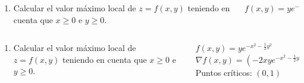 \documentclass[aspectratio=149,10pt,t]{beamer}
\begin{document}
\begin{frame}
\begin{columns}
\begin{column}[T]{0.7\textwidth}
\begin{enumerate}
\item Calcular el valor máximo local de $z=f(x,y)$ teniendo en cuenta que $x\geq 0$ e $y\geq 0$.
\end{enumerate}
\end{column}
\begin{column}[T]{0.3\textwidth}
\begin{datos}
$f(x,y)=ye^{-x^2-\frac{1}{2}y^2}$
\end{datos}
\end{column}
\end{columns}
\end{frame}


\begin{frame}
\begin{columns}
\begin{column}[T]{0.45\textwidth}
\begin{enumerate}
  \item Calcular el valor máximo local de $z=f(x,y)$ teniendo en cuenta que $x\geq 0$ e $y\geq 0$.
\end{enumerate}
\end{column}
\begin{column}[T]{0.55\textwidth}
\begin{datos}
$f(x,y)=ye^{-x^2-\frac{1}{2}y^2}$\\
$\nabla f(x,y)=\left(-2xye^{-x^2-\frac{1}{2}y^2}, (1-y^2)e^{-x^2-\frac{1}{2}y^2}\right)$\\
Puntos críticos: $(0,1)$
\end{datos}
\end{column}
\end{columns}
\end{frame}
\end{document}
